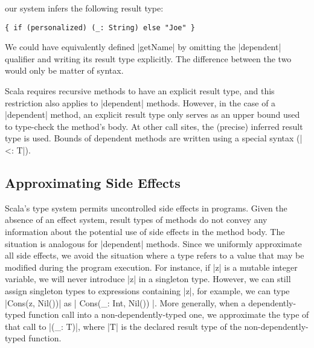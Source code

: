 \noindent
our system infers the following result type:

\begin{lstlisting}
{ if (personalized) (_: String) else "Joe" }
\end{lstlisting}

\noindent
We could have equivalently defined |getName| by omitting the |dependent| qualifier and writing its result type explicitly.
The difference between the two would only be matter of syntax.

Scala requires recursive methods to have an explicit result type, and this restriction also applies to |dependent| methods.
However, in the case of a |dependent| method, an explicit result type only serves as an upper bound used to type-check the method's body.
At other call sites, the (precise) inferred result type is used.
Bounds of dependent methods are written using a special syntax (|<: T|).

\subsection{Approximating Side Effects}

Scala's type system permits uncontrolled side effects in programs.
Given the absence of an effect system, result types of methods do not convey any information about the potential use of side effects in the method body.
The situation is analogous for |dependent| methods.
Since we uniformly approximate all side effects, we avoid the situation where a type refers to a value that may be modified during the program execution.
For instance, if |z| is a mutable integer variable, we will never introduce |z| in a singleton type.
However, we can still assign singleton types to expressions containing |z|, for example, we can type |Cons(z, Nil())| as |{ Cons(_: Int, Nil()) }|.
More generally, when a dependently-typed function call into a non-dependently-typed one, we approximate the type of that call to |(_: T)|, where |T| is the  declared result type of the non-dependently-typed function.

